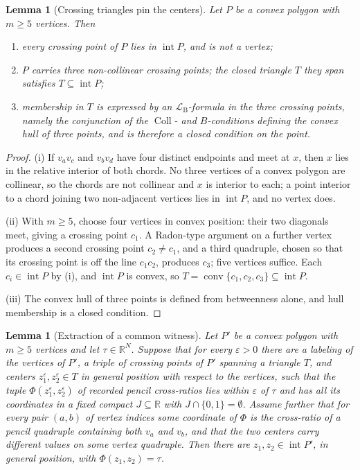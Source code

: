 \documentclass[11pt]{amsart}
\newtheorem{lemma}[theorem]{Lemma}
\theoremstyle{definition}
\newcommand{\R}{\mathbb{R}}
\newcommand{\LB}{\mathcal{L}_{\mathrm{B}}}
\newcommand{\Coll}{\operatorname{Coll}}
\newcommand{\conv}{\operatorname{conv}}
\newcommand{\interior}{\operatorname{int}}
\begin{document}
\begin{lemma}[Crossing triangles pin the centers]\label{lem:crossing}
Let $P$ be a convex polygon with $m\ge5$ vertices. Then
\begin{enumerate}[label=\textup{(\roman*)}]
\item every crossing point of $P$ lies in $\interior P$, and is not a vertex;
\item $P$ carries three non-collinear crossing points; the closed triangle $T$
they span satisfies $T\subseteq\interior P$;
\item membership in $T$ is expressed by an $\LB$-formula in the three crossing
points, namely the conjunction of the $\Coll$- and $B$-conditions defining the
convex hull of three points, and is therefore a closed condition on the point.
\end{enumerate}
\end{lemma}

\begin{proof}
(i) If $v_av_c$ and $v_bv_d$ have four distinct endpoints and meet at $x$, then
$x$ lies in the relative interior of both chords. No three vertices of a convex
polygon are collinear, so the chords are not collinear and $x$ is interior to
each; a point interior to a chord joining two non-adjacent vertices lies in
$\interior P$, and no vertex does.

(ii) With $m\ge5$, choose four vertices in convex position: their two diagonals
meet, giving a crossing point $c_1$. A Radon-type argument on a further vertex
produces a second crossing point $c_2\ne c_1$, and a third quadruple, chosen so
that its crossing point is off the line $c_1c_2$, produces $c_3$; five vertices
suffice. Each $c_i\in\interior P$ by (i), and $\interior P$ is convex, so
$T=\conv\{c_1,c_2,c_3\}\subseteq\interior P$.

(iii) The convex hull of three points is defined from betweenness alone, and
hull membership is a closed condition.
\end{proof}

\begin{lemma}[Extraction of a common witness]\label{lem:extraction}
Let $P'$ be a convex polygon with $m\ge5$ vertices and let $\tau\in\R^N$. Suppose
that for every $\varepsilon>0$ there are a labeling of the vertices of $P'$, a
triple of crossing points of $P'$ spanning a triangle $T$, and centers
$z_1^\varepsilon,z_2^\varepsilon\in T$ in general position with respect to the
vertices, such that the tuple $\Phi(z_1^\varepsilon,z_2^\varepsilon)$ of
recorded pencil cross-ratios lies within $\varepsilon$ of $\tau$ and has all its
coordinates in a fixed compact $J\subseteq\R$ with $J\cap\{0,1\}=\emptyset$.
Assume further that for every pair $(a,b)$ of vertex indices some coordinate of
$\Phi$ is the cross-ratio of a pencil quadruple containing both $v_a$ and $v_b$,
and that the two centers carry different values on some vertex quadruple. Then
there are $z_1,z_2\in\interior P'$, in general position, with
$\Phi(z_1,z_2)=\tau$.
\end{lemma}
\end{document}
